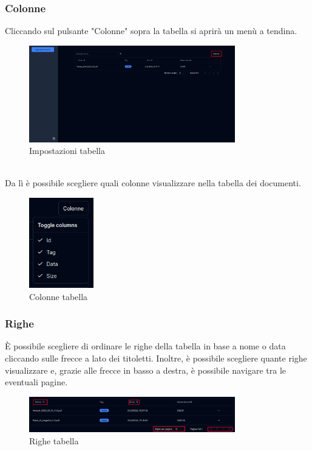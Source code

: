 \subsubsection{Colonne}
Cliccando sul pulsante "Colonne" sopra la tabella si aprirà un menù a tendina. 
\begin{figure}[h!]
    \centering
    \includegraphics[width=0.8\textwidth]{schermatadocoloumns.png}
    \caption{Impostazioni tabella}\label{fig:settingtable}
\end{figure}
\\Da lì è possibile scegliere quali colonne visualizzare nella tabella dei documenti.
\begin{figure}[h!]
    \centering
    \includegraphics[width=0.25\textwidth]{visualizzacoldoc.png}
    \caption{Colonne tabella}\label{fig:coltable}
\end{figure}
\subsubsection{Righe}
È possibile scegliere di ordinare le righe della tabella in base a nome o data cliccando sulle frecce a lato dei titoletti. Inoltre, è possibile scegliere quante righe visualizzare e, grazie alle frecce in basso a destra, è possibile navigare tra le eventuali pagine.
\begin{figure}[h!]
    \centering
    \includegraphics[width=0.8\textwidth]{visualizzaorderdoc.png}
    \caption{Righe tabella}\label{fig:rowtable}
\end{figure}
